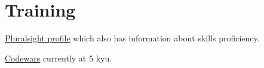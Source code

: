\documentclass[]{deedy-resume-openfont}
\begin{document}
\section{Training}
\descript{}
\begin{tightemize}
\item \href{https://app.pluralsight.com/profile/alexander-koik-cesto}{\underline{Pluralsight profile}} which also has information about skills proficiency.
\item \href{https://www.codewars.com/users/sirkoik}{\underline{Codewars}} currently at 5 kyu.
\end{tightemize}
\sectionsep

\end{document}
